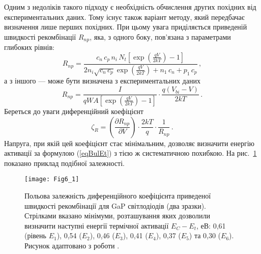 Одним з недоліків такого підходу є необхідність обчислення других похідних від експериментальних даних.
Тому існує також варіант методу, який передбачає визначення лише перших похідних.
При цьому увага приділяється приведеній швидкості рекомбінації $R_{np}$,
яка, з одного боку, пов'язана з параметрами глибоких рівнів:
\begin{equation}
  R_{np}=\frac{c_n\,c_p\,n_i\,N_t\left[\exp\left(\frac{qV}{2kT}\right)-1\right]}
   {2n_i\sqrt{c_n\,c_p}\exp\left(\frac{qV}{2kT}\right)+n_1\,c_n+p_1\,c_p}\,,
\end{equation}
а з іншого --- може бути визначена з експериментальних даних
\begin{equation}
  R_{np}=\frac{I}{qWA\left[\exp\left(\frac{qV}{2kT}\right)-1\right]}\cdot\frac{q(V_{bi}-V)}{2kT}\,.
\end{equation}
Береться до уваги диференційний коефіцієнт
\begin{equation}
  \zeta_R=\left(\frac{\partial R_{np}}{\partial V}\right)\cdot\frac{2kT}{q}\cdot\frac{1}{R_{np}}\,.
\end{equation}
Напруга, при якій цей коефіцієнт стає мінімальним, дозволяє визначити
енергію активації за формулою (\ref{eqBulEt}) з тією ж систематичною похибкою.
На рис.~\ref{F61} показано приклад подібної залежності.

\begin{figure}[!b]
\center
\texttt{[image: Fig6\_1]}
\caption{\label{F61}
Польова залежність диференційного коефіцієнта приведеної швидкості рекомбінації
для GaP світлодіодів (два зразки).
Стрілками вказано мінімуми, розташування
яких дозволили визначити наступні енергії
термічної активації $E_C-E_t$, еВ:
0,61 (рівень $E_1$), 0,54 ($E_2$),
0,46 ($E_3$), 0,41 ($E_4$),
0,37 ($E_5$) та 0,30 ($E_6$).
Рисунок адаптовано з роботи \cite{Bulyar}.
}%
\end{figure}
